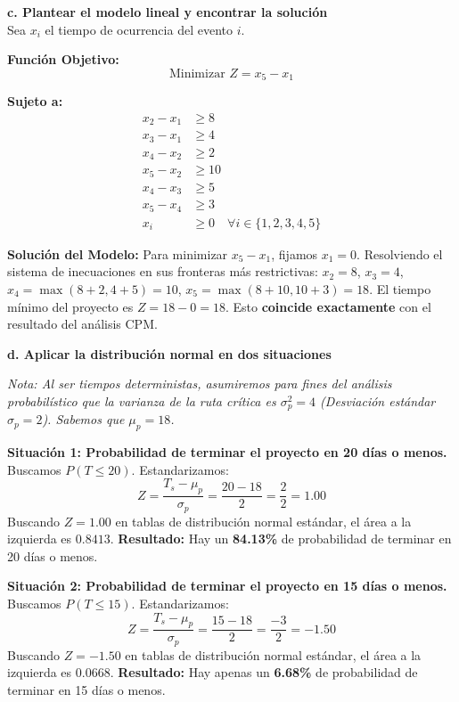 \documentclass[10pt,a4paper]{article}
\begin{document}
\vspace{0.3cm}
\textbf{c. Plantear el modelo lineal y encontrar la solución}\\
Sea $x_i$ el tiempo de ocurrencia del evento $i$.

\textbf{Función Objetivo:}
\[ \text{Minimizar } Z = x_5 - x_1 \]

\textbf{Sujeto a:}
\begin{align*}
    x_2 - x_1 &\ge 8 \\
    x_3 - x_1 &\ge 4 \\
    x_4 - x_2 &\ge 2 \\
    x_5 - x_2 &\ge 10 \\
    x_4 - x_3 &\ge 5 \\
    x_5 - x_4 &\ge 3 \\
    x_i &\ge 0 \quad \forall i \in \{1,2,3,4,5\}
\end{align*}

\textbf{Solución del Modelo:}
Para minimizar $x_5 - x_1$, fijamos $x_1 = 0$. Resolviendo el sistema de inecuaciones en sus fronteras más restrictivas:
$x_2 = 8$, $x_3 = 4$, $x_4 = \max(8+2, 4+5) = 10$, $x_5 = \max(8+10, 10+3) = 18$.
El tiempo mínimo del proyecto es $Z = 18 - 0 = 18$. Esto \textbf{coincide exactamente} con el resultado del análisis CPM.

\vspace{0.3cm}

\textbf{d. Aplicar la distribución normal en dos situaciones}

\vspace{0.3cm}

\textit{Nota: Al ser tiempos deterministas, asumiremos para fines del análisis probabilístico que la varianza de la ruta crítica es $\sigma_p^2 = 4$ (Desviación estándar $\sigma_p = 2$). Sabemos que $\mu_p = 18$.}

\vspace{0.3cm}

\textbf{Situación 1: Probabilidad de terminar el proyecto en 20 días o menos.}
Buscamos $P(T \le 20)$. Estandarizamos:
\[ Z = \frac{T_s - \mu_p}{\sigma_p} = \frac{20 - 18}{2} = \frac{2}{2} = 1.00 \]
Buscando $Z = 1.00$ en tablas de distribución normal estándar, el área a la izquierda es $0.8413$.
\textbf{Resultado:} Hay un \textbf{84.13\%} de probabilidad de terminar en 20 días o menos.

\vspace{0.3cm}

\textbf{Situación 2: Probabilidad de terminar el proyecto en 15 días o menos.}
Buscamos $P(T \le 15)$. Estandarizamos:
\[ Z = \frac{T_s - \mu_p}{\sigma_p} = \frac{15 - 18}{2} = \frac{-3}{2} = -1.50 \]
Buscando $Z = -1.50$ en tablas de distribución normal estándar, el área a la izquierda es $0.0668$.
\textbf{Resultado:} Hay apenas un \textbf{6.68\%} de probabilidad de terminar en 15 días o menos.
\end{document}
